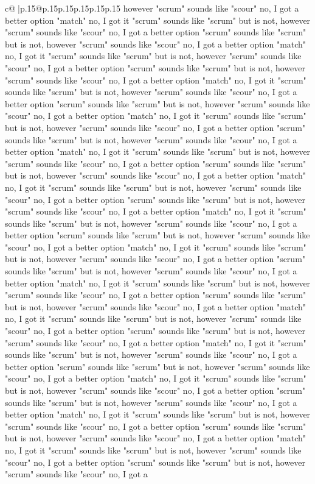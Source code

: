 \documentclass{article}
\begin{document}
{\begin{supertabular}{c@{$\;$}|p{.15\linewidth}@{}p{.15\linewidth}p{.15\linewidth}p{.15\linewidth}p{.15\linewidth}p{.15\linewidth}}
{{{however "scrum" sounds like "scour" no, I got a better option "match" no, I got it "scrum" sounds like "scrum" but is not, however "scrum" sounds like "scour" no, I got a better option "scrum" sounds like "scrum" but is not, however "scrum" sounds like "scour" no, I got a better option "match" no, I got it "scrum" sounds like "scrum" but is not, however "scrum" sounds like "scour" no, I got a better option "scrum" sounds like "scrum" but is not, however "scrum" sounds like "scour" no, I got a better option "match" no, I got it "scrum" sounds like "scrum" but is not, however "scrum" sounds like "scour" no, I got a better option "scrum" sounds like "scrum" but is not, however "scrum" sounds like "scour" no, I got a better option "match" no, I got it "scrum" sounds like "scrum" but is not, however "scrum" sounds like "scour" no, I got a better option "scrum" sounds like "scrum" but is not, however "scrum" sounds like "scour" no, I got a better option "match" no, I got it "scrum" sounds like "scrum" but is not, however "scrum" sounds like "scour" no, I got a better option "scrum" sounds like "scrum" but is not, however "scrum" sounds like "scour" no, I got a better option "match" no, I got it "scrum" sounds like "scrum" but is not, however "scrum" sounds like "scour" no, I got a better option "scrum" sounds like "scrum" but is not, however "scrum" sounds like "scour" no, I got a better option "match" no, I got it "scrum" sounds like "scrum" but is not, however "scrum" sounds like "scour" no, I got a better option "scrum" sounds like "scrum" but is not, however "scrum" sounds like "scour" no, I got a better option "match" no, I got it "scrum" sounds like "scrum" but is not, however "scrum" sounds like "scour" no, I got a better option "scrum" sounds like "scrum" but is not, however "scrum" sounds like "scour" no, I got a better option "match" no, I got it "scrum" sounds like "scrum" but is not, however "scrum" sounds like "scour" no, I got a better option "scrum" sounds like "scrum" but is not, however "scrum" sounds like "scour" no, I got a better option "match" no, I got it "scrum" sounds like "scrum" but is not, however "scrum" sounds like "scour" no, I got a better option "scrum" sounds like "scrum" but is not, however "scrum" sounds like "scour" no, I got a better option "match" no, I got it "scrum" sounds like "scrum" but is not, however "scrum" sounds like "scour" no, I got a better option "scrum" sounds like "scrum" but is not, however "scrum" sounds like "scour" no, I got a better option "match" no, I got it "scrum" sounds like "scrum" but is not, however "scrum" sounds like "scour" no, I got a better option "scrum" sounds like "scrum" but is not, however "scrum" sounds like "scour" no, I got a better option "match" no, I got it "scrum" sounds like "scrum" but is not, however "scrum" sounds like "scour" no, I got a better option "scrum" sounds like "scrum" but is not, however "scrum" sounds like "scour" no, I got a better option "match" no, I got it "scrum" sounds like "scrum" but is not, however "scrum" sounds like "scour" no, I got a better option "scrum" sounds like "scrum" but is not, however "scrum" sounds like "scour" no, I got a }}}
\end{supertabular}}
\end{document}
